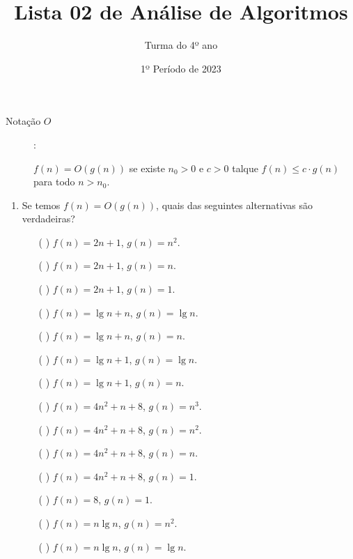 \documentclass[12pt]{article}
\title{Lista 02 de Análise de Algoritmos}
\date{1º Período de 2023}
\author{Turma do 4º ano}
\begin{document}
 

\maketitle

\begin{description}

\item[Notação $O$]: 

$f(n) = O(g(n))$ se existe $n_0>0$ e $c>0$ talque $f(n) \leq c\cdot g(n)$ para todo $n>n_0$.

\end{description}

\vspace{3em}



\begin{enumerate}

\item Se temos $f(n) = O(g(n))$, quais das seguintes alternativas são verdadeiras?

\begin{itemize}

\item[( )]  $f(n) = 2n + 1$, $g(n) = n^2$.

\item[( )]  $f(n) = 2n + 1$, $g(n) = n$.

\item[( )]  $f(n) = 2n + 1$, $g(n) = 1$.

\item[( )]  $f(n) = \lg n + n$, $g(n) = \lg n$.

\item[( )]  $f(n) = \lg n + n$, $g(n) = n$.

\item[( )]  $f(n) = \lg n + 1$, $g(n) = \lg n$.

\item[( )]  $f(n) = \lg n + 1$, $g(n) = n$.

\item[( )]  $f(n) = 4n^2 + n + 8$, $g(n) = n^3$.

\item[( )]  $f(n) = 4n^2 + n + 8$, $g(n) = n^2$.

\item[( )]  $f(n) = 4n^2 + n + 8$, $g(n) = n$.

\item[( )]  $f(n) = 4n^2 + n + 8$, $g(n) = 1$.

\item[( )]  $f(n) = 8$, $g(n) = 1$.

\item[( )]  $f(n) = n\lg n$, $g(n) = n^2$.

\item[( )]  $f(n) = n\lg n$, $g(n) = \lg n$.

\end{itemize}


\end{enumerate}
\end{document}
